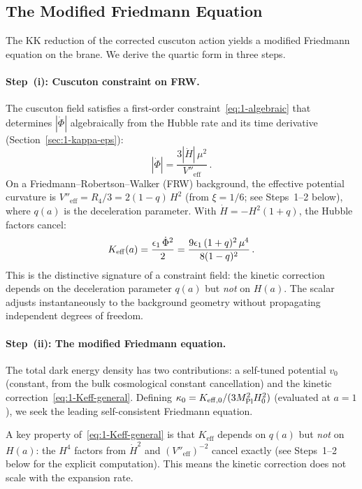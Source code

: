 \subsection{The Modified Friedmann Equation}
\label{sec:1-friedmann}

The KK reduction of the corrected cuscuton action yields a modified Friedmann equation on the brane. We derive the quartic form in three steps.

\paragraph{Step~(i): Cuscuton constraint on FRW.} The cuscuton field satisfies a first-order constraint~\eqref{eq:1-algebraic} that determines $|\dot\Phi|$ algebraically from the Hubble rate and its time derivative (Section~\ref{sec:1-kappa-eps}):
\begin{equation}
\label{eq:1-phidot-quartic}
|\dot\Phi| = \frac{3|\dot{H}|\,\mu^2}{V''_{\mathrm{eff}}}\,.
\end{equation}
On a Friedmann--Robertson--Walker (FRW) background, the effective potential curvature is $V''_{\mathrm{eff}} = R_4/3 = 2(1 - q)\,H^2$ (from $\xi = 1/6$; see Steps~1--2 below), where $q(a)$ is the deceleration parameter. With $\dot{H} = -H^2(1+q)$, the Hubble factors cancel:
\begin{equation}
\label{eq:1-Keff-general}
K_{\mathrm{eff}}(a) = \frac{\epsilon_1\,\dot\Phi^2}{2}
= \frac{9\epsilon_1\,(1+q)^2\,\mu^4}{8(1-q)^2}\,.
\end{equation}
This is the distinctive signature of a constraint field: the kinetic correction depends on the deceleration parameter $q(a)$ but \emph{not} on $H(a)$. The scalar adjusts instantaneously to the background geometry without propagating independent degrees of freedom.

\paragraph{Step~(ii): The modified Friedmann equation.} The total dark energy density has two contributions: a self-tuned potential $v_0$ (constant, from the bulk cosmological constant cancellation) and the kinetic correction~\eqref{eq:1-Keff-general}. Defining $\kappa_0 = K_{\mathrm{eff},0}/(3M_{\mathrm{Pl}}^2 H_0^2)$ (evaluated at $a = 1$), we seek the leading self-consistent Friedmann equation.

A key property of~\eqref{eq:1-Keff-general} is that $K_{\mathrm{eff}}$ depends on $q(a)$ but \emph{not} on $H(a)$: the $H^4$ factors from $\dot{H}^2$ and $(V''_{\mathrm{eff}})^{-2}$ cancel exactly (see Steps~1--2 below for the explicit computation). This means the kinetic correction does not scale with the expansion rate.

